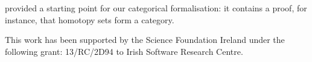 \cite{iversenUnivalentCategoriesFormalization2018} provided a starting point for
our categorical formalisation: it contains a proof, for instance, that homotopy
sets form a category.
\begin{acks}
  This work has been supported by the Science Foundation Ireland under the
  following grant: 13/RC/2D94 to Irish Software Research Centre.
\end{acks}
\printbibliography
 